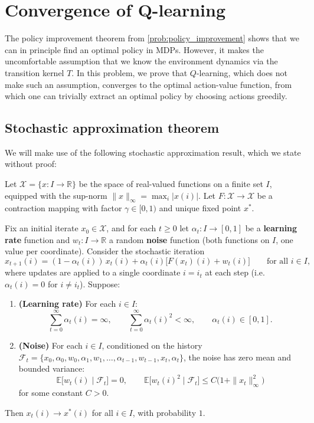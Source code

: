 \documentclass[11pt]{article}
\begin{document}

\section{Convergence of Q-learning}\label{prob:q_learning}

The policy improvement theorem from \cref{prob:policy_improvement} shows that we can in principle find an optimal policy in MDPs. However, it makes the uncomfortable assumption that we know the environment dynamics via the transition kernel $T$. In this problem, we prove that $Q$-learning, which does not make such an assumption, converges to the optimal action-value function, from which one can trivially extract an optimal policy by choosing actions greedily.

\subsection*{Stochastic approximation theorem}

We will make use of the following stochastic approximation result, which we state without proof:

\begin{theorem}\label{thm:stochastic_approx}
Let $\mathcal{X} = \{x : I \to \mathbb{R}\}$ be the space of real-valued functions on a finite set $I$, equipped with the sup-norm $\|x\|_\infty = \max_i |x(i)|$. Let $F : \mathcal{X} \to \mathcal{X}$ be a contraction mapping with factor $\gamma \in [0,1)$ and unique fixed point $x^*$.

Fix an initial iterate $x_0 \in \mathcal{X}$, and for each $t \geq 0$ let $\alpha_t : I \to [0,1]$ be a \textbf{learning rate} function and $w_t : I \to \mathbb{R}$ a random \textbf{noise} function (both functions on $I$, one value per coordinate). Consider the stochastic iteration
$$
x_{t+1}(i) = (1 - \alpha_t(i))\, x_t(i) + \alpha_t(i)\bigl[F(x_t)(i) + w_t(i)\bigr] \qquad \text{for all } i \in I,
$$
where updates are applied to a single coordinate $i = i_t$ at each step (i.e.\ $\alpha_t(i) = 0$ for $i \neq i_t$). Suppose:
\begin{enumerate}
\item[(a)] \textbf{(Learning rate)} For each $i \in I$:
$$
\sum_{t=0}^{\infty} \alpha_t(i) = \infty, \qquad \sum_{t=0}^{\infty} \alpha_t(i)^2 < \infty, \qquad \alpha_t(i) \in [0,1].
$$
\item[(b)] \textbf{(Noise)} For each $i \in I$, conditioned on the history $\mathcal{F}_t = \{x_0, \alpha_0, w_0, \alpha_1, w_1, \ldots, \alpha_{t-1}, w_{t-1}, x_t, \alpha_t\}$, the noise has zero mean and bounded variance:
$$
\mathbb{E}\big[w_t(i) \mid \mathcal{F}_t\big] = 0, \qquad \mathbb{E}\big[w_t(i)^2 \mid \mathcal{F}_t\big] \le C\bigl(1 + \|x_t\|_\infty^2\bigr)
$$
for some constant $C > 0$.
\end{enumerate}
Then $x_t(i) \to x^*(i)$ for all $i \in I$, with probability $1$.
\end{theorem}
\end{document}

